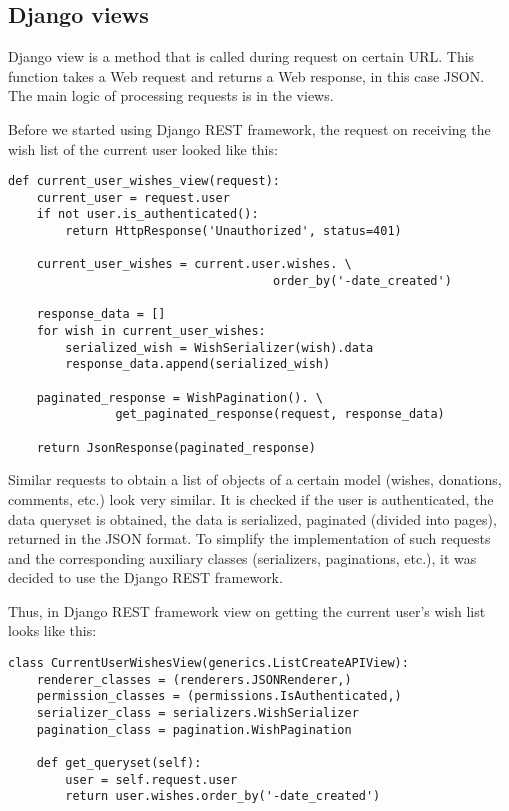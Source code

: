 \subsection{Django views}
Django view is a method that is called during request on certain \ac{URL}. This function takes a Web request and returns
a Web response, in this case JSON. The main logic of processing requests is in the views.

Before we started using Django REST framework, the request on receiving the wish list of the current user looked like
this:
\begin{lstlisting}
def current_user_wishes_view(request):
    current_user = request.user
    if not user.is_authenticated():
        return HttpResponse('Unauthorized', status=401)

    current_user_wishes = current.user.wishes. \
                                     order_by('-date_created')

    response_data = []
    for wish in current_user_wishes:
        serialized_wish = WishSerializer(wish).data
        response_data.append(serialized_wish)

    paginated_response = WishPagination(). \
               get_paginated_response(request, response_data)

    return JsonResponse(paginated_response)

\end{lstlisting}
Similar requests to obtain a list of objects of a certain model (wishes, donations, comments, etc.) look very similar.
It is checked if the user is authenticated, the data queryset is obtained, the data is serialized, paginated (divided
into pages), returned in the \ac{JSON} format. To simplify the implementation of such requests and the corresponding
auxiliary classes (serializers, paginations, etc.), it was decided to use the Django REST framework.

Thus, in Django REST framework view on getting the current user's wish list looks like this:

\begin{lstlisting}
class CurrentUserWishesView(generics.ListCreateAPIView):
    renderer_classes = (renderers.JSONRenderer,)
    permission_classes = (permissions.IsAuthenticated,)
    serializer_class = serializers.WishSerializer
    pagination_class = pagination.WishPagination

    def get_queryset(self):
        user = self.request.user
        return user.wishes.order_by('-date_created')
\end{lstlisting}

